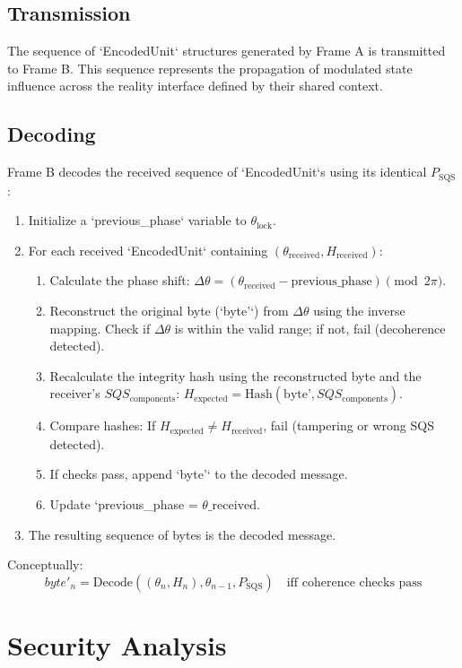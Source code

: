 \documentclass[11pt]{article}
\newcommand{\piConst}{\pi}   %
\newcommand{\SQS}{P_{\text{SQS}}}        %
\newcommand{\SQScomp}{SQS_{\text{components}}} %
\newcommand{\SQSphase}{\theta_{\text{lock}}} %
\begin{document}
	\subsection{Transmission}
	The sequence of `EncodedUnit` structures generated by Frame A is transmitted to Frame B. This sequence represents the propagation of modulated state influence across the reality interface defined by their shared context.
	
	\subsection{Decoding}
	Frame B decodes the received sequence of `EncodedUnit`s using its identical $\SQS$:
	\begin{enumerate}
		\item Initialize a `previous\_phase` variable to $\SQSphase$.
		\item For each received `EncodedUnit` containing $(\theta_{\text{received}}, H_{\text{received}})$:
		\begin{enumerate}
			\item Calculate the phase shift: $\Delta\theta = (\theta_{\text{received}} - \text{previous\_phase}) \pmod{2\piConst}$.
			\item Reconstruct the original byte (`byte'`) from $\Delta\theta$ using the inverse mapping. Check if $\Delta\theta$ is within the valid range; if not, fail (decoherence detected).
			\item Recalculate the integrity hash using the reconstructed byte and the receiver's $\SQScomp$: $H_{\text{expected}} = \text{Hash}(\text{byte'}, \SQScomp)$.
			\item Compare hashes: If $H_{\text{expected}} \neq H_{\text{received}}$, fail (tampering or wrong SQS detected).
			\item If checks pass, append `byte'` to the decoded message.
			\item Update `previous\_phase = $\theta\_{\text{received}}$.
		\end{enumerate}
		\item The resulting sequence of bytes is the decoded message.
	\end{enumerate}
	Conceptually:
	\begin{equation}
		byte'_n = \text{Decode}((\theta_{n}, H_n), \theta_{n-1}, \SQS) \quad \text{iff coherence checks pass}
	\end{equation}
	
	\section{Security Analysis}
	
\end{document}
